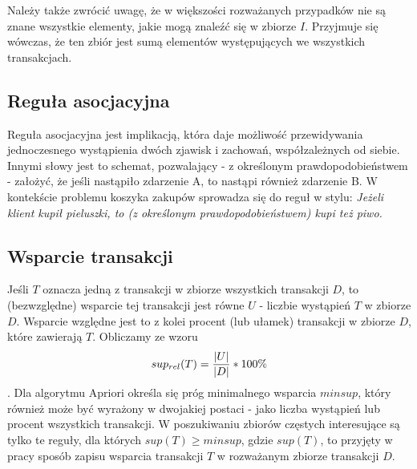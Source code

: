 Należy także zwrócić uwagę, że w większości rozważanych przypadków nie są znane wszystkie elementy, jakie mogą znaleźć się w zbiorze \(I\). Przyjmuje się wówczas, że ten zbiór jest sumą elementów występujących we wszystkich transakcjach.

\subsection{Reguła asocjacyjna}
\label{c222}
Reguła asocjacyjna jest implikacją, która daje możliwość przewidywania jednoczesnego wystąpienia dwóch zjawisk i zachowań, współzależnych od siebie. Innymi słowy jest to schemat, pozwalający - z określonym prawdopodobieństwem - założyć, że jeśli nastąpiło zdarzenie A, to nastąpi również zdarzenie B. W kontekście problemu koszyka zakupów sprowadza się do reguł w stylu: \textit{Jeżeli klient kupił pieluszki, to (z określonym prawdopodobieństwem) kupi też piwo.}

\subsection{Wsparcie transakcji}
\label{c223}
Jeśli \(T\) oznacza jedną z transakcji w zbiorze wszystkich transakcji \(D\), to (bezwzględne) wsparcie tej transakcji jest równe \(U\) - liczbie wystąpień \(T\) w zbiorze \(D\). Wsparcie względne jest to z kolei procent (lub ułamek) transakcji w zbiorze \(D\), które zawierają \(T\). Obliczamy ze wzoru \[sup_{rel}(T)=\nolinebreak\frac{|U|}{|D|}*100\%\]. Dla algorytmu Apriori określa się próg minimalnego wsparcia \(minsup\), który również może być wyrażony w dwojakiej postaci - jako liczba wystąpień lub procent wszystkich transakcji. W poszukiwaniu zbiorów częstych interesujące są tylko te reguły, dla których \(sup(T) \geq minsup \), gdzie \(sup(T)\), to przyjęty w pracy sposób zapisu wsparcia transakcji \(T\) w rozważanym zbiorze transakcji \(D\).

